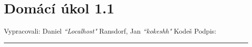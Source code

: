 \documentclass[12pt]{article}
\begin{document}
\section*{Domácí úkol 1.1}

Vypracovali: Daniel \textit{``Localhost"} Ransdorf, Jan \textit{``kokeshh"} Kodeš \hfill Podpis: \rule{4cm}{0.4pt}

\begin{enumerate}
  



























  \newcommand{\norm}[1]{\left\lVert#1\right\rVert}















\end{enumerate}
\end{document}
